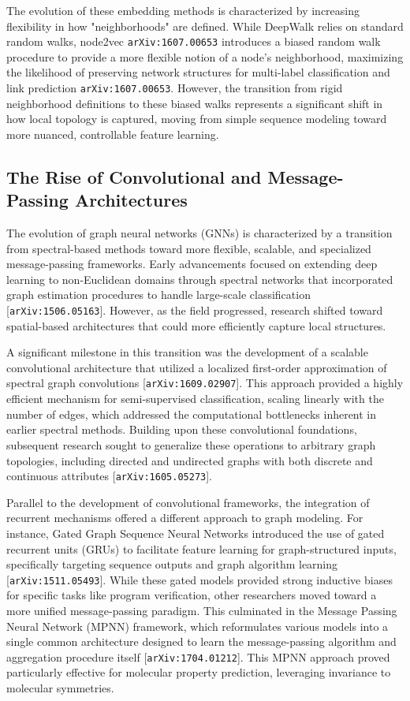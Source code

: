 \documentclass[11pt]{article}
\begin{document}
The evolution of these embedding methods is characterized by increasing flexibility in how "neighborhoods" are defined. While DeepWalk relies on standard random walks, node2vec \texttt{arXiv:1607.00653} introduces a biased random walk procedure to provide a more flexible notion of a node's neighborhood, maximizing the likelihood of preserving network structures for multi-label classification and link prediction \texttt{arXiv:1607.00653}. However, the transition from rigid neighborhood definitions to these biased walks represents a significant shift in how local topology is captured, moving from simple sequence modeling toward more nuanced, controllable feature learning.

\subsection{The Rise of Convolutional and Message-Passing Architectures}

The evolution of graph neural networks (GNNs) is characterized by a transition from spectral-based methods toward more flexible, scalable, and specialized message-passing frameworks. Early advancements focused on extending deep learning to non-Euclidean domains through spectral networks that incorporated graph estimation procedures to handle large-scale classification [\texttt{arXiv:1506.05163}]. However, as the field progressed, research shifted toward spatial-based architectures that could more efficiently capture local structures.

A significant milestone in this transition was the development of a scalable convolutional architecture that utilized a localized first-order approximation of spectral graph convolutions [\texttt{arXiv:1609.02907}]. This approach provided a highly efficient mechanism for semi-supervised classification, scaling linearly with the number of edges, which addressed the computational bottlenecks inherent in earlier spectral methods. Building upon these convolutional foundations, subsequent research sought to generalize these operations to arbitrary graph topologies, including directed and undirected graphs with both discrete and continuous attributes [\texttt{arXiv:1605.05273}].

Parallel to the development of convolutional frameworks, the integration of recurrent mechanisms offered a different approach to graph modeling. For instance, Gated Graph Sequence Neural Networks introduced the use of gated recurrent units (GRUs) to facilitate feature learning for graph-structured inputs, specifically targeting sequence outputs and graph algorithm learning [\texttt{arXiv:1511.05493}]. While these gated models provided strong inductive biases for specific tasks like program verification, other researchers moved toward a more unified message-passing paradigm. This culminated in the Message Passing Neural Network (MPNN) framework, which reformulates various models into a single common architecture designed to learn the message-passing algorithm and aggregation procedure itself [\texttt{arXiv:1704.01212}]. This MPNN approach proved particularly effective for molecular property prediction, leveraging invariance to molecular symmetries.
\end{document}

